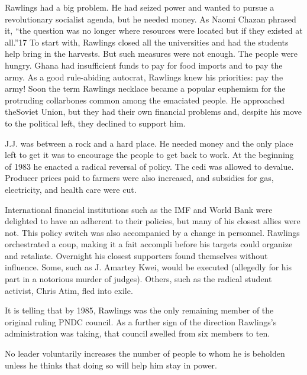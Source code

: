 \documentclass[10pt]{article}
\begin{document}
{\large Rawlings had a big problem. He had seized power and wanted to pursue a
revolutionary socialist agenda, but he needed money. As Naomi Chazan phrased it,
``the question was no longer where resources were located but if they existed at
all.''17 To start with, Rawlings closed all the universities and had the students
help bring in the harvests. But such measures were not enough. The people were
hungry. Ghana had insufficient funds to pay for food imports and to pay the army.
As a good rule-abiding autocrat, Rawlings knew his priorities: pay the army! Soon
the term Rawlings necklace became a popular euphemism for the protruding
collarbones common among the emaciated people. He approached theSoviet Union, but
they had their own financial problems and, despite his move to the political
left, they declined to support him.}

{\large J.J. was between a rock and a hard place. He needed money and the only
place left to get it was to encourage the people to get back to work. At the
beginning of 1983 he enacted a radical reversal of policy. The cedi was allowed
to devalue. Producer prices paid to farmers were also increased, and subsidies
for gas, electricity, and health care were cut.}

{\large International financial institutions such as the IMF and World Bank were
delighted to have an adherent to their policies, but many of his closest allies
were not. This policy switch was also accompanied by a change in personnel.
Rawlings orchestrated a coup, making it a fait accompli before his targets could
organize and retaliate. Overnight his closest supporters found themselves without
influence. Some, such as J. Amartey Kwei, would be executed (allegedly for his
part in a notorious murder of judges). Others, such as the radical student
activist, Chris Atim, fled into exile.}

{\large It is telling that by 1985, Rawlings was the only remaining member of
the original ruling PNDC council. As a further sign of the direction Rawlings's
administration was taking, that council swelled from six members to ten.}

{\large No leader voluntarily increases the number of people to whom he is
beholden unless he thinks that doing so will help him stay in power.}
\end{document}
